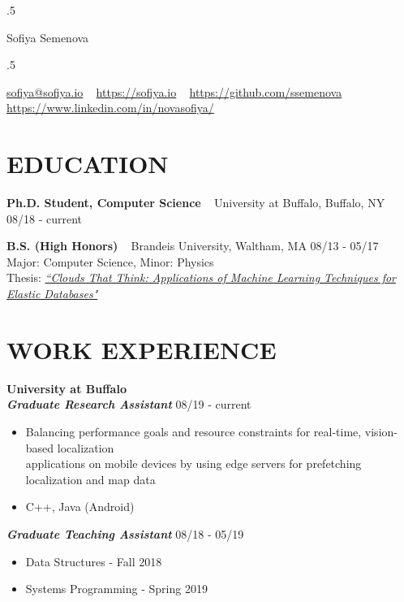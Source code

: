 \documentclass{res}
\begin{document}
 \moveleft.5\hoffset\centerline{\namefont Sofiya Semenova}
 \smallskip
 \moveleft.5\hoffset\centerline{\href{mailto:sofiya@sofiya.io}{sofiya@sofiya.io} ~ \href{https://sofiya.io}{https://sofiya.io} ~ \href{http://github.com/ssemenova}{https://github.com/ssemenova} ~ \href{https://www.linkedin.com/in/novasofiya/}{https://www.linkedin.com/in/novasofiya/}}


\vspace{2mm}

\begin{resume}


\section{EDUCATION}
\vspace{2mm}
\textbf{Ph.D. Student, Computer Science} ~ University at Buffalo, Buffalo, NY \hfill 08/18 - current

\textbf{B.S. (High Honors)} ~ Brandeis University, Waltham, MA \hfill 08/13 - 05/17 \\
	Major: Computer Science, Minor: Physics \\
	Thesis: \href{https://sofiya.io/media/thesis.pdf}{\sl “Clouds That Think: Applications of Machine Learning Techniques for Elastic Databases"}
\vspace{2mm}

\section{WORK EXPERIENCE}
\vspace{2mm}
\textbf{\large{University at Buffalo}}
\vspace{1mm} \\
\textbf{\textit{Graduate Research Assistant} }\hfill 08/19 - current \\
	\begin{itemize}   \itemsep -1pt %
	\item Balancing performance goals and resource constraints for real-time, vision-based localization \\
	applications on mobile devices by using edge servers for prefetching localization and map data
	\item C++, Java (Android)
	\end{itemize}
\textbf{\textit{Graduate Teaching Assistant}}  \hfill 08/18 - 05/19 \\ 
	\begin{itemize}  \itemsep -1pt %
	\item Data Structures - Fall 2018
	\item Systems Programming - Spring 2019
	\end{itemize}
\vspace{3mm}


\end{resume}
\end{document}
